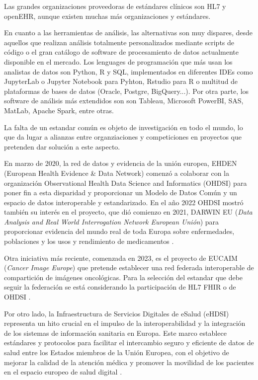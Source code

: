 Las grandes organizaciones proveedoras de estándares clínicos son HL7 y openEHR, aunque existen muchas más organizaciones y estándares. 

En cuanto a las herramientas de análisis, las alternativas son muy dispares, desde aquellos que realizan análisis totalmente personalizados mediante scripts de código o el gran catálogo de software de procesamiento de datos actualmente disponible en el mercado. Los lenguages de programación que más usan los analistas de datos son Python, R y SQL, implementados en diferentes IDEs como JupyterLab o Jupyter Notebook para Pyhton, Rstudio para R o multitud de plataformas de bases de datos (Oracle, Postgre, BigQuery...). Por otra parte, los software de análisis más extendidos son son Tableau, Microsoft PowerBI, SAS, MatLab, Apache Spark, entre otras. 

La falta de un estandar común es objeto de investigación en todo el mundo, lo que da lugar a alianzas entre organziaciones y competiciones en proyectos que pretenden dar solución a este aspecto.

En marzo de 2020, la red de datos y evidencia de la unión europea, EHDEN (European Health Evidence \& Data Network) comenzó a colaborar con la organización Observational Health Data Science and Informatics (OHDSI) para poner fin a esta disparidad y proporcionar un Modelo de Datos Común y un espacio de datos interoperable y estandarizado. En el año 2022 OHDSI mostró también su interés en el proyecto, que dió comienzo en 2021, DARWIN EU (\textit{Data Analysis and Real World Interrogation Network European Unión}) \cite{OHDSI2023Darwin} para proporcionar evidencia del mundo real de toda Europa sobre enfermedades, poblaciones y los usos y rendimiento de medicamentos \cite{Darwin2023website}.

Otra iniciativa más reciente, comenzada en 2023, es el proyecto de EUCAIM (\textit{Cancer Image Europe}) que pretende establecer una red federada interoperable de compartición de imágenes oncológicas. Para la selección del estandar que debe seguir la federación se está considerando la participación de HL7 FHIR o de OHDSI \cite{Kalokyri2023Early}.

Por otro lado, la Infraestructura de Servicios Digitales de eSalud (eHDSI) \cite{DHE2023eHDSI} representa un hito crucial en el impulso de la interoperabilidad y la integración de los sistemas de información sanitaria en Europa. Este marco establece estándares y protocolos para facilitar el intercambio seguro y eficiente de datos de salud entre los Estados miembros de la Unión Europea, con el objetivo de mejorar la calidad de la atención médica y promover la movilidad de los pacientes en el espacio europeo de salud digital \cite{EU2023Servicios}. 

